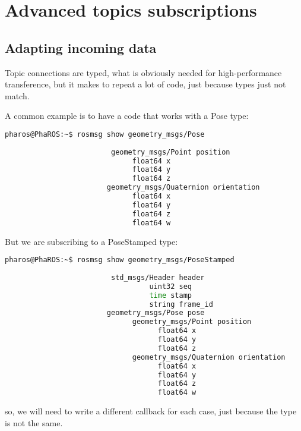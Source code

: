 \documentclass[a4paper,10pt,twoside]{book}
\begin{document}
\fi
\sloppy
\chapter { Advanced topics subscriptions }
				

					\section{Adapting incoming data}
						
						Topic connections are typed, what is obviously needed for high-performance transference, but it makes to repeat a lot of code, just because types just not match. 
						
						A common example is to have a code that works with a Pose type:
					
						\begin{lstlisting}[language=bash,title={ rosmsg - show }]
						 pharos@PhaROS:~$ rosmsg show geometry_msgs/Pose
						
						 geometry_msgs/Point position
							  float64 x
							  float64 y
							  float64 z
						geometry_msgs/Quaternion orientation
							  float64 x
							  float64 y
							  float64 z
							  float64 w
						\end{lstlisting}

						But we are subscribing to a PoseStamped type:
						
						
						\begin{lstlisting}[language=bash,title={ rosmsg - show }]
						 pharos@PhaROS:~$ rosmsg show geometry_msgs/PoseStamped
						
						 std_msgs/Header header
								  uint32 seq
								  time stamp
								  string frame_id
						geometry_msgs/Pose pose
							  geometry_msgs/Point position
								    float64 x
								    float64 y
								    float64 z
						  	  geometry_msgs/Quaternion orientation
								    float64 x
								    float64 y
								    float64 z
								    float64 w

						\end{lstlisting}
						
						
						
						so, we will need to write a different callback for each case, just because the type is not the same. 
						
\end{document}
